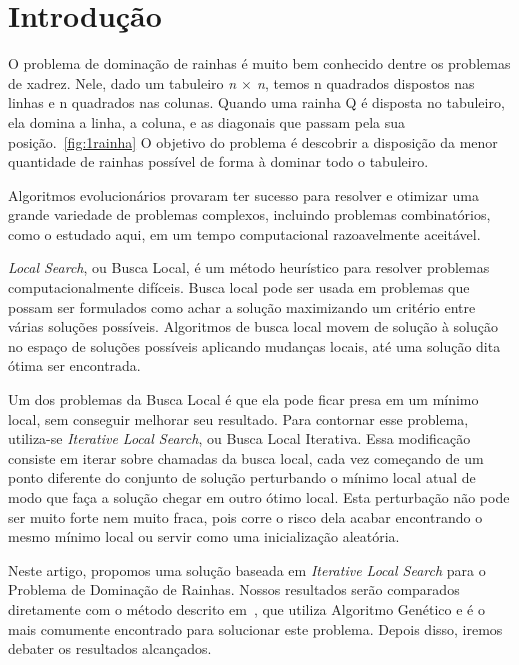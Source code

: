 \documentclass[
	article,			%
	11pt,				%
	oneside,			%
	a4paper,			%
	english,			%
	brazil,				%
	sumario=tradicional
	]{abntex2}
\begin{document}
\textual

\section{Introdução}

O problema de dominação de rainhas é muito bem conhecido dentre os problemas de xadrez. Nele, dado um tabuleiro \textit{n $\times$ n}, temos n quadrados dispostos nas linhas e n quadrados nas colunas. Quando uma rainha Q é disposta no tabuleiro, ela domina a linha, a coluna, e as diagonais que passam pela sua posição.~\ref{fig:1rainha} O objetivo do problema é descobrir a disposição da menor quantidade de rainhas possível de forma à dominar todo o tabuleiro.

 Algoritmos evolucionários provaram ter sucesso para resolver e otimizar uma grande variedade de problemas complexos, incluindo problemas combinatórios, como o estudado aqui, em um tempo computacional razoavelmente aceitável.~\cite{doerr2011evolutionary}

\textit{Local Search}, ou Busca Local, é um método heurístico para resolver problemas computacionalmente difíceis. Busca local pode ser usada em problemas que possam ser formulados como achar a solução maximizando um critério entre várias soluções possíveis. Algoritmos de busca local movem de solução à solução no espaço de soluções possíveis aplicando mudanças locais, até uma solução dita ótima ser encontrada.~\cite{hoos2004stochastic}

Um dos problemas da Busca Local é que ela pode ficar presa em um mínimo local, sem conseguir melhorar seu resultado. Para contornar esse problema, utiliza-se \textit{Iterative Local Search}, ou Busca Local Iterativa. Essa modificação consiste em iterar sobre chamadas da busca local, cada vez começando de um ponto diferente do conjunto de solução perturbando o mínimo local atual de modo que faça a solução chegar em outro ótimo local. Esta perturbação não pode ser muito forte nem muito fraca, pois corre o risco dela acabar encontrando o mesmo mínimo local ou servir como uma inicialização aleatória.~\cite{lourencco2010iterated}

  Neste artigo, propomos uma solução baseada em \textit{Iterative Local Search} para o Problema de Dominação de Rainhas. Nossos resultados serão comparados diretamente com o método descrito em~\cite{alharbi2017genetic}, que utiliza Algoritmo Genético e é o mais comumente encontrado para solucionar este problema. Depois disso, iremos debater os resultados alcançados.
\end{document}
